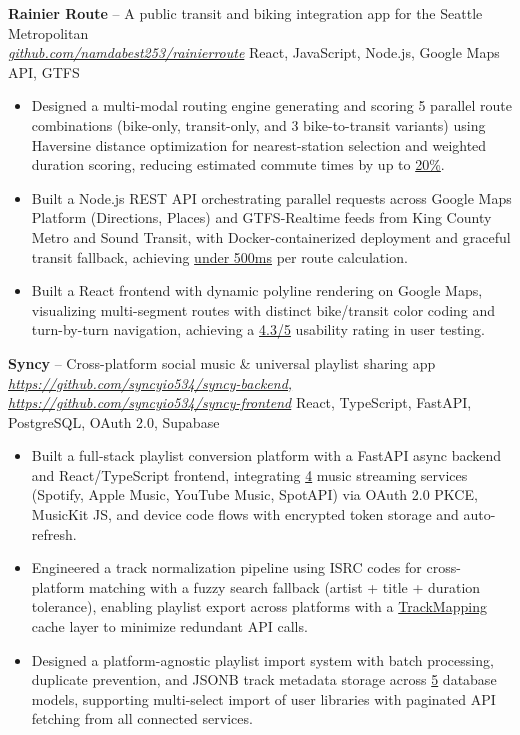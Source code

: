 \documentclass[10pt]{article}
\begin{document}
\textbf{Rainier Route} -- A public transit and biking integration app for the Seattle Metropolitan\\
\href{https://github.com/namdabest253/rainierroute}{\textit{github.com/namdabest253/rainierroute}} \textbar{} React, JavaScript, Node.js, Google Maps API, GTFS
\vspace*{-0.5em}
\begin{itemize}
    \item Designed a multi-modal routing engine generating and scoring 5 parallel route
    combinations (bike-only, transit-only, and 3 bike-to-transit variants) using
    Haversine distance optimization for nearest-station selection and weighted duration
    scoring, reducing estimated commute times by up to \underline{20\%}.
    \item Built a Node.js REST API orchestrating parallel requests across Google Maps
    Platform (Directions, Places) and GTFS-Realtime feeds from King County Metro and
    Sound Transit, with Docker-containerized deployment and graceful transit fallback,
    achieving \underline{under 500ms} per route calculation.
    \item Built a React frontend with dynamic polyline rendering on Google Maps,
    visualizing multi-segment routes with distinct bike/transit color coding and
    turn-by-turn navigation, achieving a \underline{4.3/5} usability rating in user
    testing.
\end{itemize}

\textbf{Syncy} -- Cross-platform social music \& universal playlist sharing app\\
  \href{https://github.com/syncyio534/syncy-backend, https://github.com/syncyio534/syncy-frontend}{\textit{https://github.com/syncyio534/syncy-backend, https://github.com/syncyio534/syncy-frontend}} \textbar{} React, TypeScript, FastAPI,
  PostgreSQL, OAuth 2.0, Supabase
  \vspace*{-0.5em}
  \begin{itemize}
      \item Built a full-stack playlist conversion platform with a FastAPI async backend and React/TypeScript frontend,
  integrating \underline{4} music streaming services (Spotify, Apple Music, YouTube Music, SpotAPI) via OAuth 2.0 PKCE,
  MusicKit JS, and device code flows with encrypted token storage and auto-refresh.

      \item Engineered a track normalization pipeline using ISRC codes for cross-platform matching with a fuzzy search fallback
   (artist + title + duration tolerance), enabling playlist export across platforms with a \underline{TrackMapping} cache layer
   to minimize redundant API calls.

      \item Designed a platform-agnostic playlist import system with batch processing, duplicate prevention, and JSONB track
  metadata storage across \underline{5} database models, supporting multi-select import of user libraries with paginated API
  fetching from all connected services.
\end{itemize}
\end{document}
